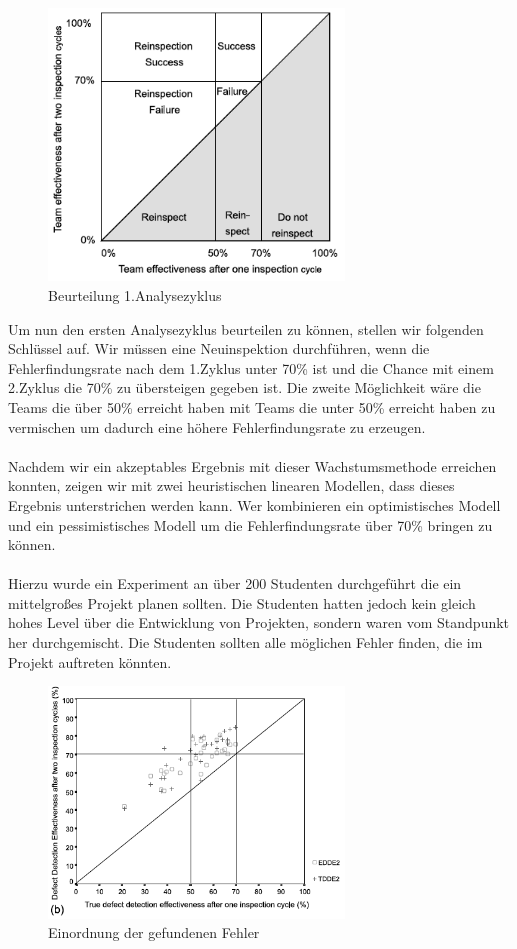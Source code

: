 \documentclass{llncs}
\begin{document}
\begin{figure}
	\centering
	\includegraphics[width=0.7\textwidth]{images/3_2_2.png}
	\caption{Beurteilung 1.Analysezyklus}
	\label{fig:3_2_2_png}
\end{figure}

Um nun den ersten Analysezyklus beurteilen zu können, stellen wir folgenden Schlüssel auf. Wir müssen eine Neuinspektion durchführen, wenn die Fehlerfindungsrate nach dem 1.Zyklus unter 70\% ist und die Chance mit einem 2.Zyklus die 70\% zu übersteigen gegeben ist. Die zweite Möglichkeit wäre die Teams die über 50\% erreicht haben mit Teams die unter 50\% erreicht haben zu vermischen um dadurch eine höhere Fehlerfindungsrate zu erzeugen.
\\ \\
Nachdem wir ein akzeptables Ergebnis mit dieser Wachstumsmethode erreichen konnten, zeigen wir mit zwei heuristischen linearen Modellen, dass dieses Ergebnis unterstrichen werden kann. Wer kombinieren ein optimistisches Modell und ein pessimistisches Modell um die Fehlerfindungsrate über 70\% bringen zu können. 
\\ \\
Hierzu wurde ein Experiment an über 200 Studenten durchgeführt die ein mittelgroßes Projekt planen sollten. Die Studenten hatten jedoch kein gleich hohes Level über die Entwicklung von Projekten, sondern waren vom Standpunkt her durchgemischt. Die Studenten sollten alle möglichen Fehler finden, die im Projekt auftreten könnten.

\begin{figure}
	\centering
	\includegraphics[width=0.7\textwidth]{images/3_2_3.png}
	\caption{Einordnung der gefundenen Fehler}
	\label{fig:3_2_2_png}
\end{figure}
\end{document}
